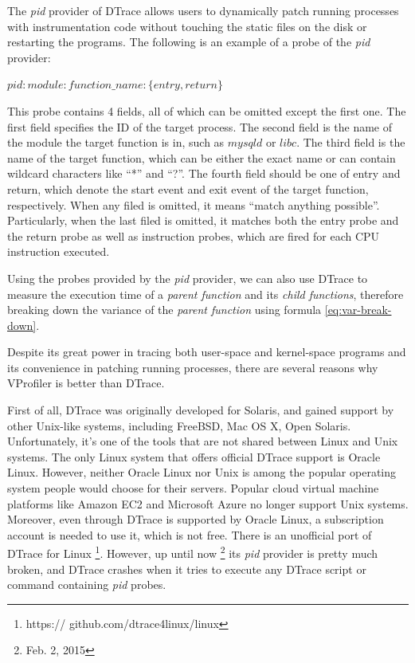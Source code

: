 The \textit{pid} provider of DTrace allows users to dynamically patch running
processes with instrumentation code without touching the static files on the 
disk or restarting the programs. The following is an example of a probe of the
\textit{pid} provider:

$pid:module:function\_name:\{entry, return\}$

This probe contains 4 fields, all of which can be omitted except the first one.
The first field specifies the ID of the target process. The second field is
the name of the module the target function is in, such as $mysqld$ or $libc$.
The third field is the name of the target function, which can be either the
exact name or can contain wildcard characters like ``*'' and ``?''. The fourth
field should be one of entry and return, which denote the start event and
exit event of the target function, respectively. When any filed is omitted, it
means ``match anything possible''. Particularly, when the last filed is
omitted, it matches both the entry probe and the return probe as well as
instruction probes, which are fired for each CPU instruction executed.

Using the probes provided by the \textit{pid} provider, we can also use DTrace
to measure the execution time of a \textit{parent function} and its
\textit{child functions}, therefore breaking down the variance of the
\textit{parent function} using formula \ref{eq:var-break-down}.

Despite its great power in tracing both user-space and kernel-space programs
and its convenience in patching running processes, there are several reasons
why VProfiler is better than DTrace.

First of all, DTrace was originally developed for Solaris, and gained support
by other Unix-like systems, including FreeBSD, Mac OS X, Open Solaris.
Unfortunately, it's one of the tools that are not shared between Linux and Unix
systems. The only Linux system that offers official DTrace support is Oracle
Linux. However, neither Oracle Linux nor Unix is among the popular operating
system people would choose for their servers. Popular cloud virtual machine
platforms like Amazon EC2 and Microsoft Azure no longer support Unix systems.
Moreover, even through DTrace is supported by Oracle Linux, a subscription
account is needed to use it, which is not free. There is an unofficial port of
DTrace for Linux \footnote{https:// github.com/dtrace4linux/linux}. However,
up until now \footnote{Feb. 2, 2015} its \textit{pid} provider is pretty much
broken, and DTrace crashes when it tries to execute any DTrace script or
command containing \textit{pid} probes.

